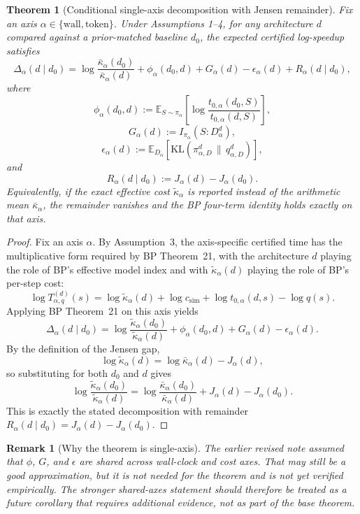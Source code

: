 \documentclass[11pt]{article}
\newtheorem{theorem}{Theorem}
\newtheorem{remark}{Remark}
\begin{document}
\begin{theorem}[Conditional single-axis decomposition with Jensen remainder]
Fix an axis $\alpha \in \{\mathrm{wall}, \mathrm{token}\}$.
Under Assumptions 1--4, for any architecture $d$ compared against a prior-matched baseline $d_0$,
the expected certified log-speedup satisfies
\[
\Delta_\alpha(d \mid d_0)
=
\log \frac{\bar\kappa_\alpha(d_0)}{\bar\kappa_\alpha(d)}
+ \phi_\alpha(d_0,d)
+ G_\alpha(d)
- \epsilon_\alpha(d)
+ R_\alpha(d \mid d_0),
\]
where
\[
\phi_\alpha(d_0,d)
:=
\mathbb{E}_{S \sim \pi_\alpha}\!\left[
\log \frac{t_{0,\alpha}(d_0,S)}{t_{0,\alpha}(d,S)}
\right],
\]
\[
G_\alpha(d)
:=
I_{\pi_\alpha}(S : D_\alpha^d),
\]
\[
\epsilon_\alpha(d)
:=
\mathbb{E}_{D_\alpha}\!\left[
\mathrm{KL}(\pi_{\alpha,D}^d \,\|\, q_{\alpha,D}^d)
\right],
\]
and
\[
R_\alpha(d \mid d_0)
:=
J_\alpha(d)-J_\alpha(d_0).
\]
Equivalently, if the exact effective cost $\tilde\kappa_\alpha$ is reported instead of the arithmetic
mean $\bar\kappa_\alpha$, the remainder vanishes and the BP four-term identity holds exactly on
that axis.
\end{theorem}

\begin{proof}
Fix an axis $\alpha$.
By Assumption~3, the axis-specific certified time has the multiplicative form required by BP
Theorem~21, with the architecture $d$ playing the role of BP's effective model index and with
$\tilde\kappa_\alpha(d)$ playing the role of BP's per-step cost:
\[
\log T_{\alpha,q}^{(d)}(s)
=
\log \tilde\kappa_\alpha(d)
+
\log c_{\mathrm{sim}}
+
\log t_{0,\alpha}(d,s)
-
\log q(s).
\]
Applying BP Theorem~21 on this axis yields
\[
\Delta_\alpha(d \mid d_0)
=
\log \frac{\tilde\kappa_\alpha(d_0)}{\tilde\kappa_\alpha(d)}
+ \phi_\alpha(d_0,d)
+ G_\alpha(d)
- \epsilon_\alpha(d).
\]
By the definition of the Jensen gap,
\[
\log \tilde\kappa_\alpha(d)
=
\log \bar\kappa_\alpha(d) - J_\alpha(d),
\]
so substituting for both $d_0$ and $d$ gives
\[
\log \frac{\tilde\kappa_\alpha(d_0)}{\tilde\kappa_\alpha(d)}
=
\log \frac{\bar\kappa_\alpha(d_0)}{\bar\kappa_\alpha(d)}
+ J_\alpha(d)-J_\alpha(d_0).
\]
This is exactly the stated decomposition with remainder
$R_\alpha(d \mid d_0)=J_\alpha(d)-J_\alpha(d_0)$.
\end{proof}

\begin{remark}[Why the theorem is single-axis]
The earlier revised note assumed that $\phi$, $G$, and $\epsilon$ are shared across wall-clock and
cost axes. That may still be a good approximation, but it is not needed for the theorem and is not
yet verified empirically. The stronger shared-axes statement should therefore be treated as a
\emph{future corollary} that requires additional evidence, not as part of the base theorem.
\end{remark}
\end{document}

